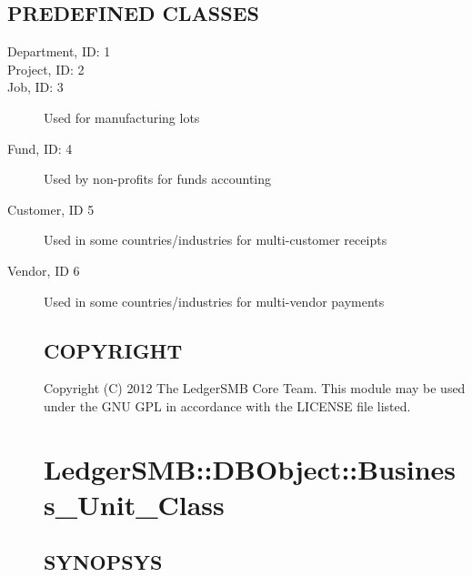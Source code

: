 \subsection*{PREDEFINED CLASSES\label{LedgerSMB::DBObject::Business_Unit_Class_PREDEFINED_CLASSES}}
\begin{description}

\item[{Department, ID: 1}] \mbox{}
\item[{Project, ID: 2}] \mbox{}
\item[{Job, ID: 3}] \mbox{}

Used for manufacturing lots


\item[{Fund, ID: 4}] \mbox{}

Used by non-profits for funds accounting


\item[{Customer, ID 5}] \mbox{}

Used in some countries/industries for multi-customer receipts


\item[{Vendor, ID 6}] \mbox{}

Used in some countries/industries for multi-vendor payments

\subsection*{COPYRIGHT\label{LedgerSMB::DBObject::Business_Unit_Class_COPYRIGHT}}


Copyright (C) 2012 The LedgerSMB Core Team.  This module may be used under the
GNU GPL in accordance with the LICENSE file listed.

\section{LedgerSMB::DBObject::Business\_Unit\_Class\label{LedgerSMB::DBObject::Business_Unit_Class}}




\subsection*{SYNOPSYS\label{LedgerSMB::DBObject::Business_Unit_Class_SYNOPSYS}}



\end{description}

